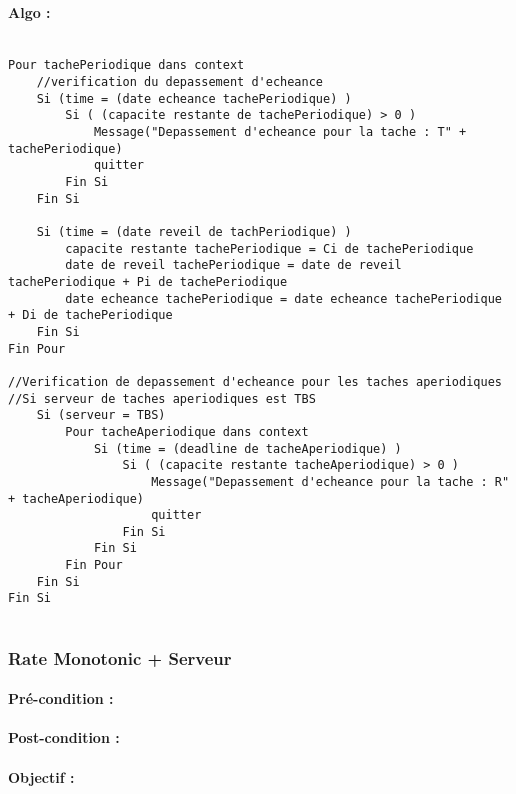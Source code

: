 				\paragraph{Algo :} 
					\begin{verbatim}
					
Pour tachePeriodique dans context
	//verification du depassement d'echeance
	Si (time = (date echeance tachePeriodique) )
		Si ( (capacite restante de tachePeriodique) > 0 )
			Message("Depassement d'echeance pour la tache : T" + tachePeriodique)
			quitter
		Fin Si
	Fin Si
	
	Si (time = (date reveil de tachPeriodique) )
		capacite restante tachePeriodique = Ci de tachePeriodique
		date de reveil tachePeriodique = date de reveil tachePeriodique + Pi de tachePeriodique
		date echeance tachePeriodique = date echeance tachePeriodique + Di de tachePeriodique
	Fin Si
Fin Pour

//Verification de depassement d'echeance pour les taches aperiodiques
//Si serveur de taches aperiodiques est TBS
	Si (serveur = TBS)
		Pour tacheAperiodique dans context
			Si (time = (deadline de tacheAperiodique) )
				Si ( (capacite restante tacheAperiodique) > 0 )
					Message("Depassement d'echeance pour la tache : R" + tacheAperiodique)
					quitter
				Fin Si
			Fin Si
		Fin Pour
	Fin Si
Fin Si
		
					\end{verbatim}
			\subsubsection{Rate Monotonic + Serveur}
				\paragraph{Pré-condition :} 
				\paragraph{Post-condition :} 
				\paragraph{Objectif :} 
